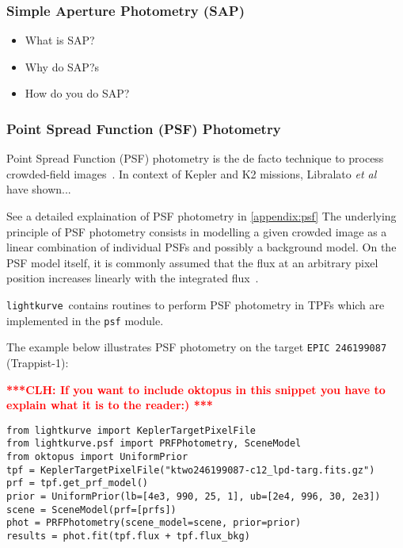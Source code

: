 \documentclass[twocolumn]{aastex62}
\newcommand{\lightkurve}{\texttt{lightkurve}}
\newcommand{\clh}[1]{\textcolor{red}{ \textbf{***CLH: #1 ***}}}
\begin{document}
    \subsubsection{Simple Aperture Photometry (SAP)}
    \begin{itemize}
        \item What is SAP?
        \item Why do SAP?s
        \item How do you do SAP?
    \end{itemize}

    \subsubsection{Point Spread Function (PSF) Photometry}
        Point Spread Function (PSF) photometry is the de facto technique to
        process crowded-field images~\cite{stetson1987, heasley1999}. In context of Kepler
        and K2 missions, Libralato \textit{et al}~\cite{libralato2016} have shown...

        See a detailed explaination of PSF photometry in \ref{appendix:psf}
        The underlying principle of PSF photometry consists in modelling a given crowded
        image as a linear combination of individual PSFs and possibly a background model.
        On the PSF model itself, it is commonly assumed that the flux
        at an arbitrary pixel position increases linearly with the integrated
        flux~\cite{stetson1987, heasley1999}.

        \lightkurve ~contains routines to perform PSF photometry in TPFs
        which are implemented in the \texttt{psf} module.

        The example below illustrates PSF photometry on the target \texttt{EPIC 246199087}
        (Trappist-1):

        \clh{If you want to include oktopus in this snippet you have to explain what it is to the reader:)}
\begin{verbatim}
from lightkurve import KeplerTargetPixelFile
from lightkurve.psf import PRFPhotometry, SceneModel
from oktopus import UniformPrior
tpf = KeplerTargetPixelFile("ktwo246199087-c12_lpd-targ.fits.gz")
prf = tpf.get_prf_model()
prior = UniformPrior(lb=[4e3, 990, 25, 1], ub=[2e4, 996, 30, 2e3])
scene = SceneModel(prf=[prfs])
phot = PRFPhotometry(scene_model=scene, prior=prior)
results = phot.fit(tpf.flux + tpf.flux_bkg)
\end{verbatim}
\end{document}
